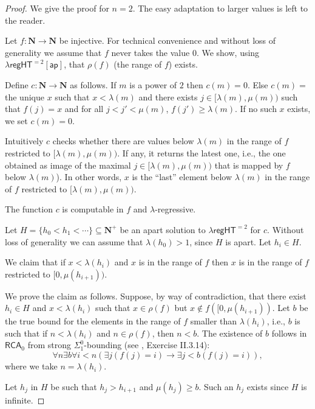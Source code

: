 \documentclass[a4paper,11pt]{article}
\newcommand\Nat{\mathbf{N}}
\newcommand\RCA{\mathsf{RCA}}
\newcommand\regHT{\mathsf{regHT}}
\newcommand\ap{\mathsf{ap}}
\begin{document}
\begin{proof}
We give the proof for $n=2$. The easy adaptation to larger values is left to the reader. 

Let $f:\Nat\to\Nat$ be injective. For technical convenience and without loss of generality we assume that $f$ never takes the value $0$. We show, using $\lambda\regHT^{= 2}[\ap]$, that $\rho(f)$ (the range of $f$) exists. 

Define $c:\Nat\to \Nat$ as follows. If $m$ is a power of $2$ then $c(m)=0$. Else 
$c(m)=$ the unique $x$ such that $x < \lambda(m)$ 
and there exists $j \in [\lambda(m), \mu(m))$ such that $f(j)=x$ and for all $j < j' < \mu(m)$, 
$f(j') \geq \lambda(m)$. If no such $x$ exists, we set $c(m)=0$. 

Intuitively $c$ checks whether there are values below $\lambda(m)$ in the range of $f$ restricted
to $[\lambda(m), \mu(m))$. If any, it returns the latest one, i.e., the one obtained as image of the 
maximal $j \in [\lambda(m), \mu(m))$ that is mapped by $f$ below $\lambda(m)$). 
In other words, $x$ is the ``last'' element below $\lambda(m)$
in the range of $f$ restricted to $[\lambda(m), \mu(m))$. 

The function $c$ is computable in $f$ and $\lambda$-regressive.

Let $H = \{ h_0 < h_1 < \cdots \}\subseteq\Nat^+$ be an apart solution to $\lambda\regHT^{= 2}$ for $c$. Without loss of generality 
we can assume that $\lambda(h_0) > 1$, since $H$ is apart. Let $h_i \in H$. 

We claim that if $x < \lambda(h_i)$ and $x$ is in the range of $f$ then $x$ is in the range of $f$ restricted to $[0, \mu(h_{i+1}))$. 

We prove the claim as follows. Suppose, by way of contradiction, that there exist $h_i\in H$ and $x< \lambda(h_i)$ such that $x \in \rho(f)$ but $x \notin f([0, \mu(h_{i+1}))$. Let $b$ be the true bound for the elements in the range of $f$
smaller than $\lambda(h_i)$, i.e., $b$ is such that if $n < \lambda(h_i)$ and $n\in \rho(f)$, then $n < b$. The existence of $b$ follows in $\RCA_0$ from strong $\Sigma^0_1$-bounding (see 
\cite{Sim:SOSOA}, Exercise II.3.14):
$$ \forall n \exists b \forall i < n ( \exists j (f(j)=i) \to \exists j < b (f(j)=i)),$$
where we take $n=\lambda(h_i)$.

Let $h_j$ in $H$ be such that $h_j > h_{i+1}$ and $\mu(h_j) \geq b$. Such an $h_j$ exists since $H$ is infinite. 


\end{proof}
\end{document}
